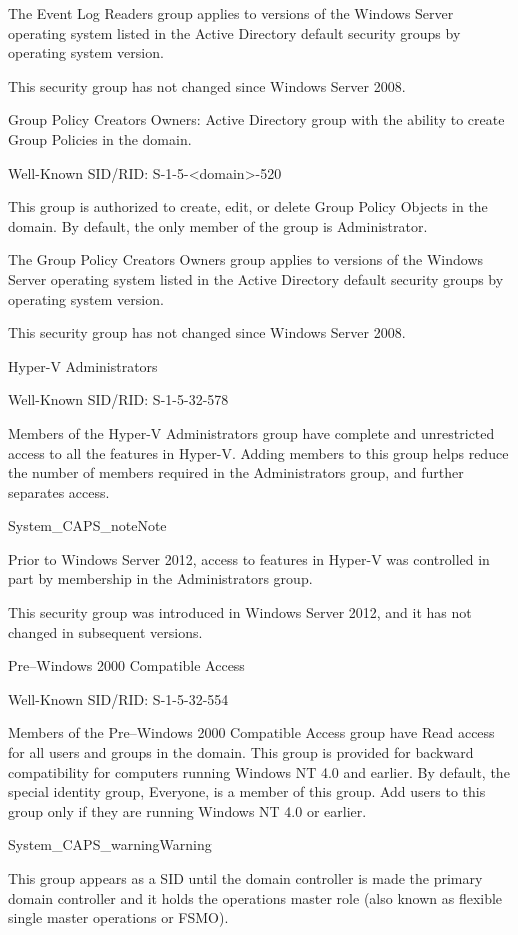 The Event Log Readers group applies to versions of the Windows Server operating system listed in the Active Directory default security groups by operating system version.

This security group has not changed since Windows Server 2008.

Group Policy Creators Owners: Active Directory group with the ability to create Group Policies in the domain.

Well-Known SID/RID: S-1-5-<domain>-520

This group is authorized to create, edit, or delete Group Policy Objects in the domain. By default, the only member of the group is Administrator.

The Group Policy Creators Owners group applies to versions of the Windows Server operating system listed in the Active Directory default security groups by operating system version.

This security group has not changed since Windows Server 2008.

Hyper-V Administrators

Well-Known SID/RID: S-1-5-32-578

Members of the Hyper-V Administrators group have complete and unrestricted access to all the features in Hyper-V. Adding members to this group helps reduce the number of members required in the Administrators group, and further separates access.

System\_CAPS\_noteNote

Prior to Windows Server 2012, access to features in Hyper-V was controlled in part by membership in the Administrators group.

This security group was introduced in Windows Server 2012, and it has not changed in subsequent versions.

Pre–Windows 2000 Compatible Access

Well-Known SID/RID: S-1-5-32-554

Members of the Pre–Windows 2000 Compatible Access group have Read access for all users and groups in the domain. This group is provided for backward compatibility for computers running Windows NT 4.0 and earlier. By default, the special identity group, Everyone, is a member of this group. Add users to this group only if they are running Windows NT 4.0 or earlier.

System\_CAPS\_warningWarning

This group appears as a SID until the domain controller is made the primary domain controller and it holds the operations master role (also known as flexible single master operations or FSMO).

